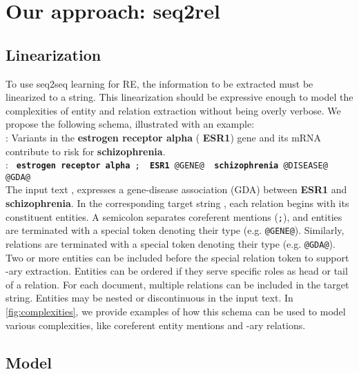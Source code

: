 \documentclass[11pt]{article}
\begin{document}
\section{Our approach: seq2rel}

\subsection{Linearization} \label{linearization}

To use seq2seq learning for RE, the information to be extracted must be linearized to a string. This linearization should be expressive enough to model the complexities of entity and relation extraction without being overly verbose. We propose the following schema, illustrated with an example: \\

\noindent
{\small
: Variants in the {\color{MyPurple} \textbf{estrogen receptor alpha}} ({\color{MyPurple} \textbf{ESR1}}) gene and its mRNA contribute to risk for {\color{MyOrange} \textbf{schizophrenia}}.
}\\
\noindent
{\small
: \texttt{{\color{MyPurple} \textbf{estrogen receptor alpha}} ; {\color{MyPurple} \textbf{ESR1} @GENE@} {\color{MyOrange} \textbf{schizophrenia} @DISEASE@} @GDA@}
}\\

\noindent
The input text , expresses a gene-disease association (GDA) between {\color{MyPurple} \textbf{ESR1}} and {\color{MyOrange} \textbf{schizophrenia}}. In the corresponding target string , each relation begins with its constituent entities. A semicolon separates coreferent mentions (\texttt{;}), and entities are terminated with a special token denoting their type (e.g. \texttt{@GENE@}). Similarly, relations are terminated with a special token denoting their type (e.g. \texttt{@GDA@}). Two or more entities can be included before the special relation token to support -ary extraction. Entities can be ordered if they serve specific roles as head or tail of a relation. For each document, multiple relations can be included in the target string. Entities may be nested or discontinuous in the input text. In \autoref{fig:complexities}, we provide examples of how this schema can be used to model various complexities, like coreferent entity mentions and -ary relations.

\subsection{Model} \label{model}
\end{document}
